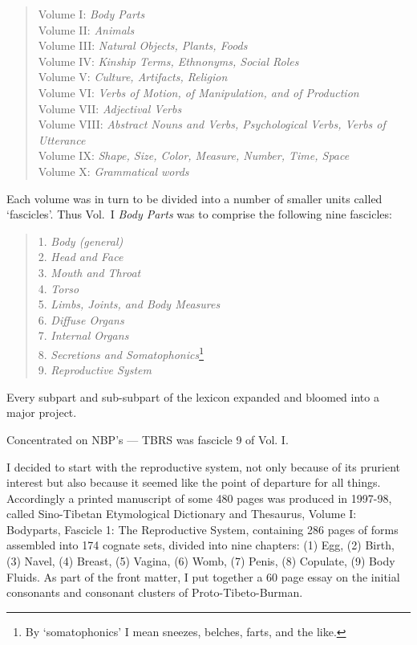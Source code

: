 \begin{quote}
{\footnotesize
Volume I: \textit{Body Parts}\nopagebreak[4]\\
Volume II: \textit{Animals}\\
Volume III: \textit{Natural Objects, Plants, Foods }\\
Volume IV: \textit{Kinship Terms, Ethnonyms, Social Roles}\\
Volume V: \textit{Culture, Artifacts, Religion}\\
Volume VI: \textit{Verbs of Motion, of Manipulation, and of Production}\\
Volume VII: \textit{Adjectival Verbs}\\
Volume VIII: \textit{Abstract Nouns and Verbs, Psychological Verbs, Verbs of Utterance }\\
Volume IX: \textit{Shape, Size, Color, Measure, Number, Time, Space}\\
Volume X: \textit{Grammatical words}\\
}
\end{quote}

Each volume was in turn to be divided into a number of smaller units called
‘fascicles’. Thus Vol.~I \textit{Body Parts} was to comprise the following nine
fascicles:

\begin{quote}
{\footnotesize
1. \textit{Body (general)}\\
2. \textit{Head and Face}\\
3. \textit{Mouth and Throat}\\
4. \textit{Torso}\\
5. \textit{Limbs, Joints, and Body Measures}\\
6. \textit{Diffuse Organs}\\
7. \textit{Internal Organs}\\
8. \textit{Secretions and Somatophonics}\footnote{By ‘somatophonics’ I mean sneezes,
belches, farts, and the like.}\\
9. \textit{Reproductive System}\\
}
\end{quote}

Every subpart and sub-subpart of the lexicon expanded and bloomed into a major project. 

Concentrated on NBP’s --- TBRS was fascicle 9 of Vol. I.

I decided to start with the reproductive system, not only because of its prurient interest but also because it seemed like the point of departure for all things. Accordingly a printed manuscript of some 480 pages was produced in 1997-98, called Sino-Tibetan Etymological Dictionary and Thesaurus, Volume I: Bodyparts, Fascicle 1: The Reproductive System, containing 286 pages of forms assembled into 174 cognate sets, divided into nine chapters: (1) Egg, (2) Birth, (3) Navel, (4) Breast, (5) Vagina, (6) Womb, (7) Penis, (8) Copulate, (9) Body Fluids. As part of the front matter, I put together a 60 page essay on the initial consonants and consonant clusters of Proto-Tibeto-Burman.

